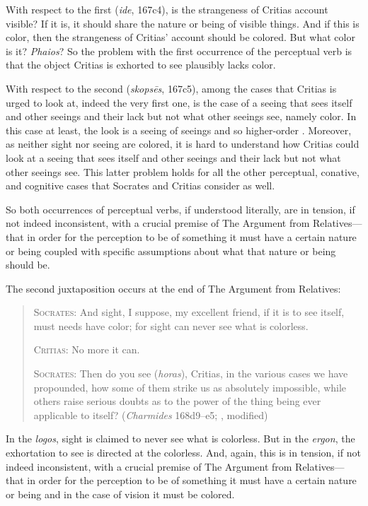 With respect to the first (\emph{ide}, 167c4), is the strangeness of Critias account visible? If it is, it should share the nature or being of visible things. And if this is color, then the strangeness of Critias' account should be colored. But what color is it? \emph{Phaios}? So the problem with the first occurrence of the perceptual verb is that the object Critias is exhorted to see plausibly lacks color.

With respect to the second (\emph{skopsēs}, 167c5), among the cases that Critias is urged to look at, indeed the very first one, is the case of a seeing that sees itself and other seeings and their lack but not what other seeings see, namely color. In this case at least, the look is a seeing of seeings and so higher-order \citep[9–10]{McCabe:2007ss}. Moreover, as neither sight nor seeing are colored, it is hard to understand how Critias could look at a seeing that sees itself and other seeings and their lack but not what other seeings see. This latter problem holds for all the other perceptual, conative, and cognitive cases that Socrates and Critias consider as well.

So both occurrences of perceptual verbs, if understood literally, are in tension, if not indeed inconsistent, with a crucial premise of The Argument from Relatives—that in order for the perception to be of something it must have a certain nature or being coupled with specific assumptions about what that nature or being should be.

The second juxtaposition occurs at the end of The Argument from Relatives:
\begin{quotation}
	\textsc{Socrates}: And sight, I suppose, my excellent friend, if it is to see itself, must needs have color; for sight can never see what is colorless.
	
	\textsc{Critias}: No more it can.
	
	\textsc{Socrates}: Then do you see (\emph{horas}), Critias, in the various cases we have propounded, how some of them strike us as absolutely impossible, while others raise serious doubts as to the power of the thing being ever applicable to itself? (\emph{Charmides} 168d9–e5; \citealt[63]{Lamb:1927qw}, modified)
\end{quotation}
In the \emph{logos}, sight is claimed to never see what is colorless. But in the \emph{ergon}, the exhortation to see is directed at the colorless. And, again, this is in tension, if not indeed inconsistent, with a crucial premise of The Argument from Relatives—that in order for the perception to be of something it must have a certain nature or being and in the case of vision it must be colored.

